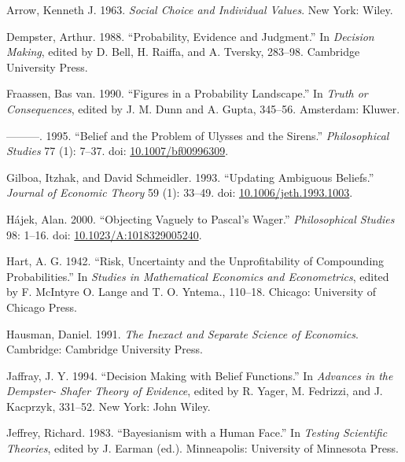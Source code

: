\documentclass[
  11pt,
  letterpaper,
  DIV=11,
  numbers=noendperiod,
  twoside]{scrartcl}
\newlength{\cslhangindent}
\newenvironment{CSLReferences}[2] %
 {\begin{list}{}{%
  \setlength{\itemindent}{0pt}
  \setlength{\leftmargin}{0pt}
  \setlength{\parsep}{0pt}
  \ifodd #1
   \setlength{\leftmargin}{\cslhangindent}
   \setlength{\itemindent}{-1\cslhangindent}
  \fi
  \setlength{\itemsep}{#2\baselineskip}}}
 {\end{list}}
\begin{document}
\label{refs}
\begin{CSLReferences}{1}{0}
Arrow, Kenneth J. 1963. \emph{Social Choice and Individual Values}. New
York: Wiley.

Dempster, Arthur. 1988. {``Probability, Evidence and Judgment.''} In
\emph{Decision Making}, edited by D. Bell, H. Raiffa, and A. Tversky,
283--98. Cambridge University Press.

Fraassen, Bas van. 1990. {``Figures in a Probability Landscape.''} In
\emph{Truth or Consequences}, edited by J. M. Dunn and A. Gupta,
345--56. Amsterdam: Kluwer.

---------. 1995. {``Belief and the Problem of Ulysses and the Sirens.''}
\emph{Philosophical Studies} 77 (1): 7--37. doi:
\href{https://doi.org/10.1007/bf00996309}{10.1007/bf00996309}.

Gilboa, Itzhak, and David Schmeidler. 1993. {``Updating Ambiguous
Beliefs.''} \emph{Journal of Economic Theory} 59 (1): 33--49. doi:
\href{https://doi.org/10.1006/jeth.1993.1003}{10.1006/jeth.1993.1003}.

Hájek, Alan. 2000. {``Objecting Vaguely to Pascal's Wager.''}
\emph{Philosophical Studies} 98: 1--16. doi:
\href{https://doi.org/10.1023/A:1018329005240}{10.1023/A:1018329005240}.

Hart, A. G. 1942. {``Risk, Uncertainty and the Unprofitability of
Compounding Probabilities.''} In \emph{Studies in Mathematical Economics
and Econometrics}, edited by F. McIntyre O. Lange and T. O. Yntema.,
110--18. Chicago: University of Chicago Press.

Hausman, Daniel. 1991. \emph{The Inexact and Separate Science of
Economics}. Cambridge: Cambridge University Press.

Jaffray, J. Y. 1994. {``Decision Making with Belief Functions.''} In
\emph{Advances in the Dempster- Shafer Theory of Evidence}, edited by R.
Yager, M. Fedrizzi, and J. Kacprzyk, 331--52. New York: John Wiley.

Jeffrey, Richard. 1983. {``Bayesianism with a Human Face.''} In
\emph{Testing Scientific Theories}, edited by J. Earman (ed.).
Minneapolis: University of Minnesota Press.


\end{CSLReferences}
\end{document}

